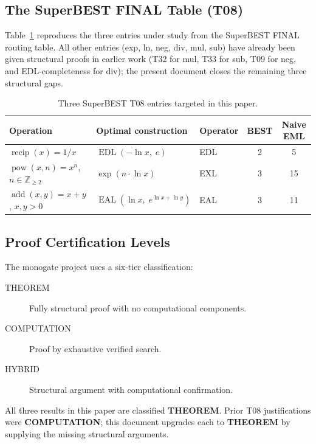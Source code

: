 \documentclass[12pt,a4paper]{article}
\theoremstyle{definition}
\newcommand{\EDL}{\operatorname{EDL}}
\newcommand{\EAL}{\operatorname{EAL}}
\newcommand{\recip}{\operatorname{recip}}
\newcommand{\pow}{\operatorname{pow}}
\newcommand{\add}{\operatorname{add}}
\begin{document}
\subsection{The SuperBEST FINAL Table (T08)}

Table~\ref{tab:T08} reproduces the three entries under study from the
SuperBEST FINAL routing table.  All other entries (exp, ln, neg, div, mul, sub)
have already been given structural proofs in earlier work
(T32 for mul, T33 for sub, T09 for neg, and EDL-completeness for div);
the present document closes the remaining three structural gaps.

\begin{table}[h]
\centering
\caption{Three SuperBEST T08 entries targeted in this paper.}
\label{tab:T08}
\smallskip
\begin{tabular}{@{}lllcc@{}}
\toprule
\textbf{Operation} & \textbf{Optimal construction} & \textbf{Operator} & \textbf{BEST} & \textbf{Naive EML} \\
\midrule
$\recip(x) = 1/x$       & $\EDL(-\ln x,\; e)$                      & EDL & 2 & 5  \\
$\pow(x,n) = x^n$, $n\in\mathbb{Z}_{\geq 2}$ & $\exp(n\cdot\ln x)$ & EXL & 3 & 15 \\
$\add(x,y) = x+y$, $x,y>0$ & $\EAL(\ln x,\; e^{\ln x + \ln y})$  & EAL & 3 & 11 \\
\bottomrule
\end{tabular}
\end{table}

\subsection{Proof Certification Levels}

The monogate project uses a six-tier classification:
\begin{description}
  \item[THEOREM] Fully structural proof with no computational components.
  \item[COMPUTATION] Proof by exhaustive verified search.
  \item[HYBRID] Structural argument with computational confirmation.
\end{description}
All three results in this paper are classified \textbf{THEOREM}.
Prior T08 justifications were \textbf{COMPUTATION}; this document upgrades
each to \textbf{THEOREM} by supplying the missing structural arguments.

\end{document}
